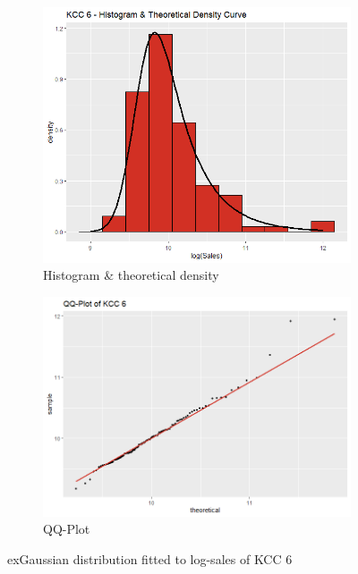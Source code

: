  \begin{figure}[H]
\centering
\begin{subfigure}{.45\textwidth}
  \centering
  \includegraphics[width=\linewidth]{figures/kcc_6_density.png}
  \caption{Histogram \& theoretical density}
  \label{fig:kcc_6_density}
\end{subfigure}
\begin{subfigure}{.45\textwidth}
  \centering
  \includegraphics[width=\linewidth]{figures/kcc_6_qqplot.png}
  \caption{QQ-Plot}
  \label{fig:kcc_6_qqplot}
\end{subfigure}
\caption{exGaussian distribution fitted to log-sales of \ac{KCC} 6}
\label{fig:kcc_6_marginal}
\end{figure} 


